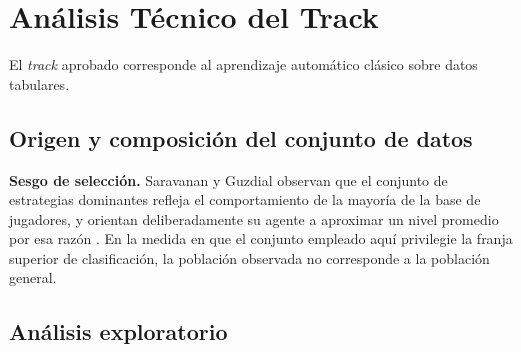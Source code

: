 %
%
\section{Análisis Técnico del Track}
\label{sec:analisistecnico}

El \textit{track} aprobado corresponde al aprendizaje automático clásico
sobre datos tabulares. 

\subsection{Origen y composición del conjunto de datos}
\label{subsec:origen}


\noindent\textbf{Sesgo de selección.}  Saravanan y Guzdial observan que
el conjunto de estrategias dominantes refleja el comportamiento de la
mayoría de la base de jugadores, y orientan deliberadamente su agente a
aproximar un nivel promedio por esa razón
\cite{saravanan_metadiscovery_2024}. En la medida en que el conjunto
empleado aquí privilegie la franja superior de clasificación, la población
observada no corresponde a la población general.


\subsection{Análisis exploratorio}
\label{subsec:eda}


